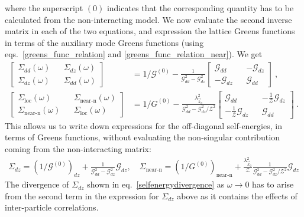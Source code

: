 \documentclass[reprint,hidelinks]{revtex4-2}
\begin{document}
where the superscript \((0)\) indicates that the corresponding quantity has to be calculated from the non-interacting model. We now evaluate the second inverse matrix in each of the two equations, and expression the lattice Greens functions in terms of the auxiliary mode Greens functions (using eqs.~\ref{greens_func_relation} and \ref{greens_func_relation_near}). We get
\begin{equation}\begin{aligned}
	\begin{bmatrix} \Sigma_{dd}(\omega) && \Sigma_{dz}(\omega) \\ \Sigma_{dz}(\omega) && \Sigma_{dd}(\omega)\end{bmatrix} &= 1/\mathcal{G}^{(0)} - \frac{1}{\mathcal{G}_{dd}^2 - \mathcal{G}_{dz}^2}\begin{bmatrix} \mathcal{G}_{dd} && -\mathcal{G}_{dz} \\ -\mathcal{G}_{dz} && \mathcal{G}_{dd}\end{bmatrix}~,\\
	\begin{bmatrix} \Sigma_\text{loc}(\omega) && \Sigma_\text{near-n}(\omega) \\ \Sigma_\text{near-n}(\omega) && \Sigma_\text{loc}(\omega)\end{bmatrix} &= 1/G^{(0)} - \frac{\lambda_{\vec k_0}^2}{\mathcal{G}_{dd}^2 - \mathcal{G}_{dz}^2 / \mathcal{Z}^2}\begin{bmatrix} \mathcal{G}_{dd} && -\frac{1}{\mathcal{Z}}\mathcal{G}_{dz} \\ -\frac{1}{\mathcal{Z}}\mathcal{G}_{dz} && \mathcal{G}_{dd}\end{bmatrix}~.
\end{aligned}\end{equation}
This allows us to write down expressions for the off-diagonal self-energies, in terms of Greens functions, without evaluating the non-singular contribution coming from the non-interacting matrix:
\begin{equation}\begin{aligned}
	\Sigma_{dz} = \left(1/\mathcal{G}^{(0)}\right)_{dz} + \frac{1}{\mathcal{G}_{dd}^2 - \mathcal{G}_{dz}^2} \mathcal{G}_{dz},\quad \Sigma_\text{near-n} = \left(1/G^{(0)}\right)_\text{near-n} + \frac{\lambda_{\vec k_0}^2}{\mathcal{Z}}\frac{1}{\mathcal{G}_{dd}^2 - \mathcal{G}_{dz}^2 / \mathcal{Z}^2} \mathcal{G}_{dz}
\end{aligned}\end{equation}
The divergence of \(\Sigma_{dz}\) shown in eq.~\ref{selfenergydivergence} as \(\omega \to 0\) has to arise from the second term in the expression for \(\Sigma_{dz}\) above as it contains the effects of inter-particle correlations.
\end{document}
